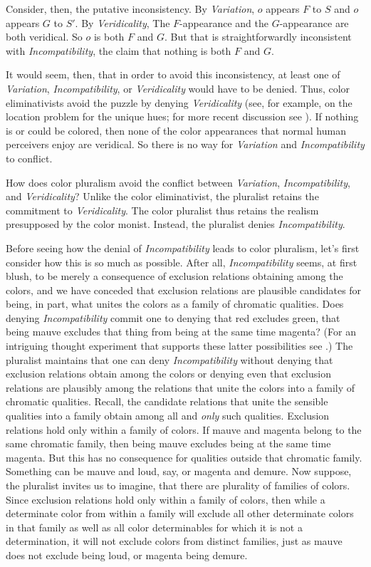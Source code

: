 \documentclass[12pt]{article}
\begin{document}
Consider, then, the putative inconsistency. By \emph{Variation}, \( o \) appears \( F \) to \( S \) and \( o \) appears \( G \) to \( S' \). By \emph{Veridicality}, The \( F \)-appearance and the \( G \)-appearance are both veridical. So \( o \) is both \( F \) and \( G \). But that is straightforwardly inconsistent with \emph{Incompatibility}, the claim that nothing is both \( F \) and \( G \). 

It would seem, then, that in order to avoid this inconsistency, at least one of \emph{Variation}, \emph{Incompatibility}, or \emph{Veridicality} would have to be denied. Thus, color eliminativists avoid the puzzle by denying \emph{Veridicality} (see, for example, \citealt{Hardin:1993kn} on the location problem for the unique hues; for more recent discussion see \citealt{Gatzia:2010ga}). If nothing is or could be colored, then none of the color appearances that normal human perceivers enjoy are veridical. So there is no way for \emph{Variation} and \emph{Incompatibility} to conflict.

How does color pluralism avoid the conflict between \emph{Variation}, \emph{Incompatibility}, and \emph{Veridicality}? Unlike the color eliminativist, the pluralist retains the commitment to \emph{Veridicality}. The color pluralist thus retains the realism presupposed by the color monist. Instead, the pluralist denies \emph{Incompatibility}.

Before seeing how the denial of \emph{Incompatibility} leads to color pluralism, let's first consider how this is so much as possible. After all, \emph{Incompatibility} seems, at first blush, to be merely a consequence of exclusion relations obtaining among the colors, and we have conceded that exclusion relations are plausible candidates for being, in part, what unites the colors as a family of chromatic qualities. Does denying \emph{Incompatibility} commit one to denying that red excludes green, that being mauve excludes that thing from being at the same time magenta? (For an intriguing thought experiment that supports these latter possibilities see \citealt{Harman:2001mv}.) The pluralist maintains that one can deny \emph{Incompatibility} without denying that exclusion relations obtain among the colors or denying even that exclusion relations are plausibly among the relations that unite the colors into a family of chromatic qualities. Recall, the candidate relations that unite the sensible qualities into a family obtain among all and \emph{only} such qualities. Exclusion relations hold only within a family of colors. If mauve and magenta belong to the same chromatic family, then being mauve excludes being at the same time magenta. But this has no consequence for qualities outside that chromatic family. Something can be mauve and loud, say, or magenta and demure. Now suppose, the pluralist invites us to imagine, that there are plurality of families of colors. Since exclusion relations hold only within a family of colors, then while a determinate color from within a family will exclude all other determinate colors in that family as well as all color determinables for which it is not a determination, it will not exclude colors from distinct families, just as mauve does not exclude being loud, or magenta being demure.
\end{document}
